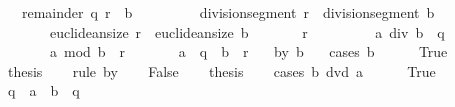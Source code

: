 \begin{isabellebody}
\ \ {\isacharbar}{\kern0pt}\ {\isacharparenleft}{\kern0pt}remainder{\isacharparenright}{\kern0pt}\ q\ r\ \ {\isachardoublequoteopen}b\ {\isasymnoteq}\ {}{\isachardoublequoteclose}\isanewline
\ \ \ \ \ \ \ {\isachardoublequoteopen}division{\isacharunderscore}{\kern0pt}segment\ r\ {\isacharequal}{\kern0pt}\ division{\isacharunderscore}{\kern0pt}segment\ b{\isachardoublequoteclose}\isanewline
\ \ \ \ \ \ \ {\isachardoublequoteopen}euclidean{\isacharunderscore}{\kern0pt}size\ r\ {\isacharless}{\kern0pt}\ euclidean{\isacharunderscore}{\kern0pt}size\ b{\isachardoublequoteclose}\isanewline
\ \ \ \ \ \ \ {\isachardoublequoteopen}r\ {\isasymnoteq}\ {}{\isachardoublequoteclose}\isanewline
\ \ \ \ \ \ \ {\isachardoublequoteopen}a\ div\ b\ {\isacharequal}{\kern0pt}\ q{\isachardoublequoteclose}\isanewline
\ \ \ \ \ \ \ {\isachardoublequoteopen}a\ mod\ b\ {\isacharequal}{\kern0pt}\ r{\isachardoublequoteclose}\isanewline
\ \ \ \ \ \ \ {\isachardoublequoteopen}a\ {\isacharequal}{\kern0pt}\ q\ {\isacharasterisk}{\kern0pt}\ b\ {\isacharplus}{\kern0pt}\ r{\isachardoublequoteclose}\isanewline
\ \ {\isacharbar}{\kern0pt}\ {\isacharparenleft}{\kern0pt}by{}{\isacharparenright}{\kern0pt}\ {\isachardoublequoteopen}b\ {\isacharequal}{\kern0pt}\ {}{\isachardoublequoteclose}\isanewline
%
\isadelimproof
%
\endisadelimproof
%
\isatagproof
{}\isamarkupfalse%
\ {\isacharparenleft}{\kern0pt}cases\ {\isachardoublequoteopen}b\ {\isacharequal}{\kern0pt}\ {}{\isachardoublequoteclose}{\isacharparenright}{\kern0pt}\isanewline
\ \ \isamarkupfalse%
\ True\isanewline
\ \ \isamarkupfalse%
\ \isamarkupfalse%
\ thesis\isanewline
\ \ \isamarkupfalse%
\ {\isacharparenleft}{\kern0pt}rule\ by{}{\isacharparenright}{\kern0pt}\isanewline
{}\isamarkupfalse%
\isanewline
\ \ \isamarkupfalse%
\ False\isanewline
\ \ \isamarkupfalse%
\ thesis\isanewline
\ \ \isamarkupfalse%
\ {\isacharparenleft}{\kern0pt}cases\ {\isachardoublequoteopen}b\ dvd\ a{\isachardoublequoteclose}{\isacharparenright}{\kern0pt}\isanewline
\ \ \ \ \isamarkupfalse%
\ True\isanewline
\ \ \ \ \isamarkupfalse%
\ \isamarkupfalse%
\ q\ \ {\isachardoublequoteopen}a\ {\isacharequal}{\kern0pt}\ b\ {\isacharasterisk}{\kern0pt}\ q{\isachardoublequoteclose}\ \isacommand{{\isachardot}{\kern0pt}{\isachardot}{\kern0pt}}\isamarkupfalse%

\end{isabellebody}
